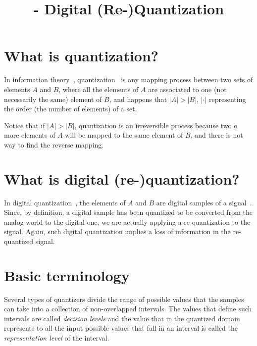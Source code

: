 


\title{\SM{} - Digital (Re-)Quantization}

\maketitle

\tableofcontents

\section{What is quantization?}

In information theory~\cite{vruiz__information_theory},
quantization~\cite{vruiz__signal_quantization,vruiz__scalar_quantization,vruiz__vector_quantization,vruiz__trellis_quantization}
is any mapping process between two sets of elements $A$ and $B$, where
all the elements of $A$ are associated to one (not necessarily the
same) element of $B$, and happens that $|A|>|B|$, $|\cdot|$
representing the order (the number of elements) of a set.

Notice that if $|A|>|B|$, quantization is an irreversible process
because two o more elements of $A$ will be mapped to the same element
of $B$, and there is not way to find the reverse mapping.

\section{What is digital (re-)quantization?}

In digital
quantization~\cite{vruiz__scalar_quantization,vruiz__vector_quantization},
the elements of $A$ and $B$ are digital samples of a
signal~\cite{vruiz__signal_quantization}. Since, by definition, a
digital sample has been quantized to be converted from the analog
world to the digital one, we are actually applying a re-quantization
to the signal. Again, such digital quantization implies a loss of
information in the re-quantized signal.

\section{Basic terminology}

Several types of quantizers divide the range of possible values that
the samples can take into a collection of non-overlapped
intervals. The values that define such intervals are called
\emph{decision levels} and the value that in the quantized domain
represents to all the input possible values that fall in an interval is
called the \emph{representation level} of the interval.

